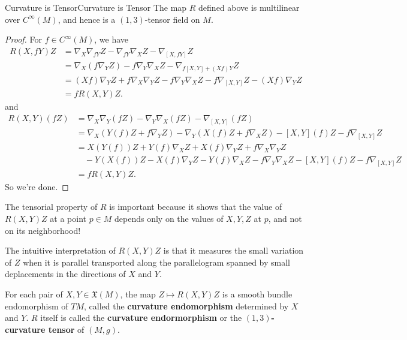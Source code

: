 \documentclass[../main.tex]{subfiles}
\begin{document}
\begin{proposition}{Curvature is Tensor}{Curvature is Tensor}
	The map $R$ defined above is multilinear over $C^\infty(M)$, and hence is a $(1, 3)$-tensor field on $M$.
\end{proposition}
\begin{proof}
	For $f \in C^\infty(M)$, we have
	\begin{equation*}
		\begin{aligned}
			R(X, fY)Z &= \nabla_X \nabla_{fY} Z - \nabla_{fY} \nabla_X Z - \nabla_{[X, fY]} Z \\
			&= \nabla_X (f \nabla_Y Z) - f \nabla_Y \nabla_X Z - \nabla_{f[X, Y] +(Xf)Y} Z \\
			&= (Xf) \nabla_Y Z + f \nabla_X \nabla_Y Z - f \nabla_Y \nabla_X Z - f \nabla_{[X, Y]} Z - (Xf) \nabla_Y Z \\
			&= f R(X, Y)Z.
		\end{aligned}
	\end{equation*}
	and
	\begin{equation*}
		\begin{aligned}
			R(X, Y)(fZ) &= \nabla_X \nabla_Y (fZ) - \nabla_Y \nabla_X (fZ) - \nabla_{[X, Y]} (fZ) \\
			&= \nabla_X (Y(f)Z + f \nabla_Y Z) - \nabla_Y (X(f)Z + f \nabla_X Z) - [X, Y](f)Z - f \nabla_{[X, Y]} Z \\
			&= X(Y(f))Z + Y(f) \nabla_X Z + X(f) \nabla_Y Z + f \nabla_X \nabla_Y Z \\
			&\quad - Y(X(f))Z - X(f) \nabla_Y Z - Y(f) \nabla_X Z - f \nabla_Y \nabla_X Z - [X, Y](f)Z - f \nabla_{[X, Y]} Z \\
			&= f R(X, Y)Z.
		\end{aligned}
	\end{equation*}
	So we're done.
\end{proof}

\begin{remark}
	The tensorial property of $R$ is important because it shows that the value of $R(X, Y)Z$ at a point $p \in M$ depends only on the values of $X, Y, Z$ at $p$, and not on its neighborhood!

	The intuitive interpretation of $R(X, Y)Z$ is that it measures the small variation of $Z$ when it is parallel transported along the parallelogram spanned by small deplacements in the directions of $X$ and $Y$.
\end{remark}

For each pair of $X, Y \in \mathfrak{X}(M)$, the map $Z \mapsto R(X, Y)Z$ is a smooth bundle endomorphism of $TM$, called the \textbf{curvature endomorphism} determined by $X$ and $Y$. $R$ itself is called the \textbf{curvature endormorphism} or the \textbf{$(1, 3)$-curvature tensor} of $(M, g)$.
\end{document}
